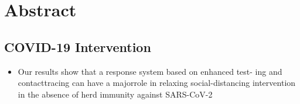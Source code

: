 
\part{Abstract}
    \chapter{COVID-19 Intervention}
        \begin{itemize}
            \item Our results show that a response system based on
            enhanced test- ing and contacttracing can have a majorrole
            in relaxing social-distancing intervention
            in the absence of herd immunity against SARS-CoV-2\cite{aleta2020modelling}
        \end{itemize}
